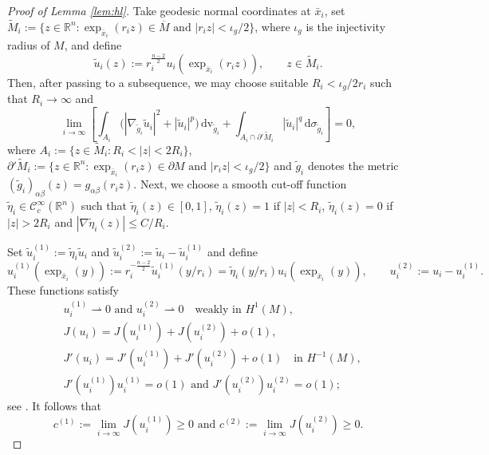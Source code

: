 \documentclass[reqno,11pt,oneside]{amsart}
\numberwithin{equation}{section}
\def\rn{\mathbb{R}^n}
\def\rh{\rightharpoonup}
\def\cC{\mathcal{C}}
\def\tilde{\widetilde}
\def\d{\,\mathrm{d}}
\def\dv{\,\mathrm{dv}}
\begin{document}
\begin{proof}[Proof of Lemma \ref{lem:hl}]
Take geodesic normal coordinates at $\bar{x}_i$, set $\tilde{M}_i:=\{z\in\rn:\exp_{\bar{x}_i}(r_iz)\in \overline{M}\text{ and }|r_iz|<\iota_g/2\}$, where $\iota_g$ is the injectivity radius of $M$, and define
$$\tilde{u}_i(z):=r_i^\frac{n-2}{2} u_i(\exp_{\bar{x}_i}(r_iz)),\qquad z\in\tilde{M}_i.$$
Then, after passing to a subsequence, we may choose suitable $R_i<\iota_g/2r_i$ such that $R_i\to\infty$ and
\begin{equation}\label{eq:annulus}
\lim_{i\to\infty}\left[\int_{A_i}\big(|\nabla_{\tilde{g}_i}\tilde{u}_i|^2+|\tilde{u}_i|^p\big)\dv_{\tilde{g}_i}+\int_{A_i\cap\partial'\tilde{M}_i}|\tilde{u}_i|^q\d\sigma_{\tilde{g}_i}\right]=0,
\end{equation}
where $A_i:=\{z\in\tilde{M}_i:R_i<|z|<2R_i\}$, $\partial'\tilde{M}_i:=\{z\in\rn:\exp_{\bar{x}_i}(r_iz)\in\partial M\text{ and }|r_iz|<\iota_g/2\}$ and $\tilde{g}_i$ denotes the metric $(\tilde{g}_i)_{\alpha\beta}(z)=g_{\alpha\beta}(r_iz)$. Next, we choose a smooth cut-off function $\tilde{\eta}_i\in\cC^\infty_c(\rn)$ such that  $\tilde{\eta}_i(z)\in[0,1]$, $\tilde{\eta}_i(z)=1$ if $|z|<R_i$, $\tilde{\eta}_i(z)=0$ if $|z|>2R_i$ and $|\nabla\tilde{\eta}_i(z)|\leq C/R_i$.

Set $\tilde{u}_i^{(1)}:=\tilde{\eta}_i\tilde{u}_i$ and $\tilde{u}_i^{(2)}:=\tilde{u}_i - \tilde{u}_i^{(1)}$ and define
$$u_i^{(1)}(\exp_{\bar{x}_i}(y)):=r_i^{-\frac{n-2}{2}}\tilde{u}_i^{(1)}(y/r_i)=\tilde{\eta}_i(y/r_i)u_i(\exp_{\bar{x}_i}(y)),\qquad u_i^{(2)}:=u_i - u_i^{(1)}.$$
These functions satisfy
\begin{align*}
&u_i^{(1)}\rh 0\text{ \ and \ }u_i^{(2)}\rh 0\quad\text{weakly in \ } H^1(M), \\
&J(u_i)=J(u_i^{(1)})+J(u_i^{(2)})+o(1),\\
&J'(u_i)=J'(u_i^{(1)})+J'(u_i^{(2)})+o(1)\quad \text{in \ }H^{-1}(M), \\
&J'(u_i^{(1)})u_i^{(1)}=o(1)\text{ \ and \ }J'(u_i^{(2)})u_i^{(2)}=o(1);
\end{align*}
see \cite[Proof of Lemma A.2]{hl}. It follows that
$$c^{(1)}:=\lim_{i\to\infty}J(u_i^{(1)})\geq0\text{ \ \ and \ \ }c^{(2)}:=\lim_{i\to\infty}J(u_i^{(2)})\geq0.$$


\end{proof}
\end{document}
